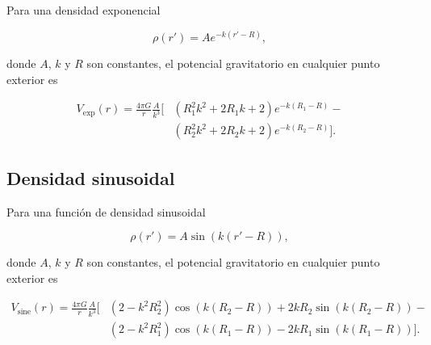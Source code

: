 \begin{subappendices}
Para una densidad exponencial

\begin{equation}
    \rho(r') = A e^{- k (r' - R)},
\end{equation}

\noindent donde $A$, $k$ y $R$ son constantes, el potencial gravitatorio en
cualquier punto exterior es

\begin{equation}
    \begin{split}
        V_\text{exp}(r) = \frac{4\pi G}{r} \frac{A}{k^3} \Big[
        & \left( R_1^2 k^2 + 2 R_1 k + 2 \right) e^{- k (R_1 - R)} - \\
        & \left( R_2^2 k^2 + 2 R_2 k + 2 \right) e^{- k (R_2 - R)}
        \Big].
    \end{split}
\end{equation}


\subsection{Densidad sinusoidal}

Para una función de densidad sinusoidal

\begin{equation}
    \rho(r') = A \sin ( k (r' - R)),
\end{equation}

\noindent donde $A$, $k$ y $R$ son constantes, el potencial gravitatorio en
cualquier punto exterior es

\begin{equation}
    \begin{split}
        V_\text{sine}(r) = \frac{4\pi G}{r} \frac{A}{k^3} \Big[
    & (2 - k^2 R_2^2) \cos(k(R_2 - R)) + 2 k R_2 \sin(k(R_2 - R)) - \\
    & (2 - k^2 R_1^2) \cos(k(R_1 - R)) - 2 k R_1 \sin(k(R_1 - R))
    \Big].
    \end{split}
\end{equation}

\end{subappendices}
